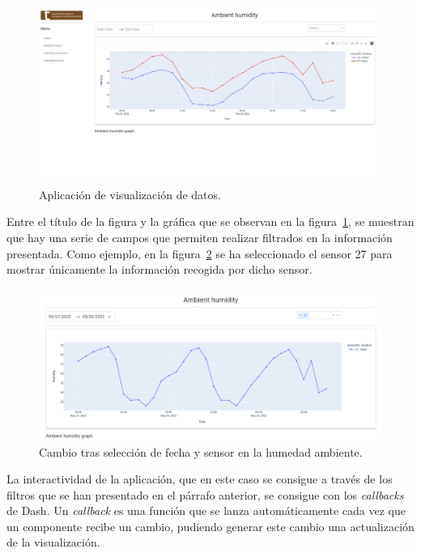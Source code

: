 \documentclass[a4paper, 12pt, oneside]{book}
\begin{document}
\begin{figure}[H]
	\centering
    \includegraphics[width=12cm, keepaspectratio]{img/humedad_ambiente_grafica}
    \caption{Aplicación de visualización de datos.}
    \label{figura:humedad_ambiente_grafica}
\end{figure}

Entre el título de la figura y la gráfica que se observan en la figura~\ref{figura:humedad_ambiente_grafica}, se muestran que hay una serie de campos que permiten realizar filtrados en la información presentada. Como ejemplo, en la figura~\ref{figura:humedad_ambiente_grafica_selectores} se ha seleccionado el sensor 27 para mostrar únicamente la información recogida por dicho sensor.

\begin{figure}[H]
	\centering
    \includegraphics[width=12cm, keepaspectratio]{img/humedad_ambiente_valores}
    \caption{Cambio tras selección de fecha y sensor en la humedad ambiente.}
    \label{figura:humedad_ambiente_grafica_selectores}
\end{figure}

La interactividad de la aplicación, que en este caso se consigue a través de los filtros que se han presentado en el párrafo anterior, se consigue con los \textit{callbacks} de Dash. Un \textit{callback} es una función que se lanza automáticamente cada vez que un componente recibe un cambio, pudiendo generar este cambio una actualización de la visualización.
\end{document}
